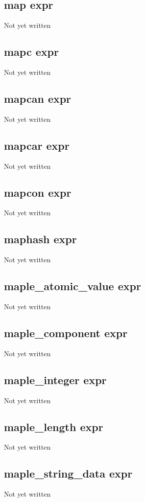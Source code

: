 \documentclass[a4paper,11pt]{article}
\begin{document}
\subsection{\ttfamily map expr}
Not yet written

\subsection{\ttfamily mapc expr}
Not yet written

\subsection{\ttfamily mapcan expr}
Not yet written

\subsection{\ttfamily mapcar expr}
Not yet written

\subsection{\ttfamily mapcon expr}
Not yet written

\subsection{\ttfamily maphash expr}
Not yet written

\subsection{\ttfamily maple\_atomic\_value expr}
Not yet written

\subsection{\ttfamily maple\_component expr}
Not yet written

\subsection{\ttfamily maple\_integer expr}
Not yet written

\subsection{\ttfamily maple\_length expr}
Not yet written

\subsection{\ttfamily maple\_string\_data expr}
Not yet written
\end{document}
